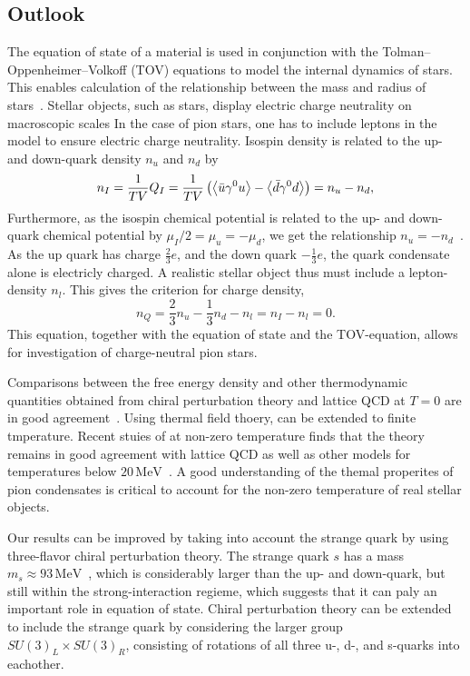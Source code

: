 \subsection*{Outlook}

The equation of state of a material is used in conjunction with the Tolman–Oppenheimer–Volkoff (TOV) equations to model the internal dynamics of stars.
This enables calculation of the relationship between the mass and radius of stars~\cite{Carroll:spacetime}.
Stellar objects, such as stars, display electric charge neutrality on macroscopic scales
In the case of pion stars, one has to include leptons in the model to ensure electric charge neutrality.
Isospin density is related to the up- and down-quark density $n_u$ and $n_d$ by
\begin{equation}
    n_I 
    = \frac{1}{TV} Q_I 
    = \frac{1}{TV} \left(\ex{\bar u \gamma^0 u} - \ex{\bar d \gamma^0 d} \right) 
    = n_u - n_d,
\end{equation}
Furthermore, as the isospin chemical potential is related to the up- and down-quark chemical potential by $\mu_I/2 = \mu_u = -\mu_d$, we get the relationship $n_u = -n_d$~\cite{new_clas_of_compact_stars}.
As the up quark has charge $\frac{2}{3}e$, and the down quark $-\frac{1}{3}e$, the quark condensate alone is electricly charged.
A realistic stellar object thus must include a lepton-density $n_l$.
This gives the criterion for charge density,
\begin{equation}
    n_Q = \frac{2}{3}n_u - \frac{1}{3} n_d - n_l = n_I - n_l = 0.
\end{equation}
This equation, together with the equation of state and the TOV-equation, allows for investigation of charge-neutral pion stars.

Comparisons between the free energy density and other thermodynamic quantities obtained from chiral perturbation theory and lattice QCD at $T = 0$ are in good agreement~\cite{Andersen:two-flavor-chpt,mojahed}.
Using thermal field thoery, \chpt can be extended to finite tmperature.
Recent stuies of \chpt at non-zero temperature finds that the theory remains in good agreement with lattice QCD as well as other models for temperatures below $20 \, \text{MeV}$~\cite{andersen_mojahed:condensates_and_pressure}.
A good understanding of the themal properites of pion condensates is critical to account for the non-zero temperature of real stellar objects.

Our results can be improved by taking into account the strange quark by using three-flavor chiral perturbation theory.
The strange quark $s$ has a mass $m_s \approx 93 \, \text{MeV}$~\cite{PDG}, which is considerably larger than the up- and down-quark, but still within the strong-interaction regieme, which suggests that it can paly an important role in equation of state.
Chiral perturbation theory can be extended to include the strange quark by considering the larger group $SU(3)_L \times SU(3)_R$, consisting of rotations of all three u-, d-, and s-quarks into eachother.

